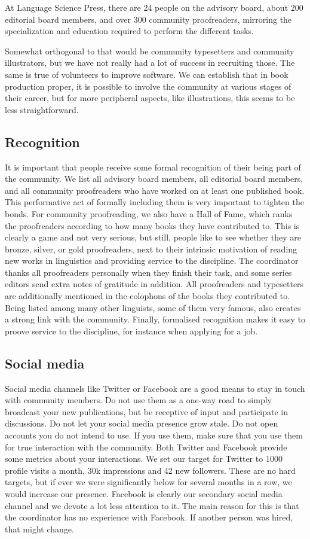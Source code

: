 \documentclass[guidelines,nonflat,modfonts] {langsci/langscibook}
\begin{document}
At Language Science Press, there are 24 people on the advisory board, about 200 editorial board members, and over 300 community proofreaders, mirroring the specialization and education required to perform the different tasks. 

Somewhat orthogonal to that would be community typesetters and community illustrators, but we have not really had a lot of success in recruiting those. The same is true of volunteers to improve software. We can establish that in book production proper, it is possible to involve the community at various stages of their career, but for more peripheral aspects, like illustrations, this seems to be less straightforward. 

\subsection{Recognition}
It is important that people receive some formal recognition of their being part of the community. We list all advisory board members, all editorial board members, and all community proofreaders who have worked on at least one published book. This performative act of formally including them is very important to tighten the bonds. For community proofreading, we also have a Hall of Fame, which ranks the proofreaders according to how many books they have contributed to. This is clearly a game and not very serious, but still, people like to see whether they are bronze, silver, or gold proofreaders, next to their intrinsic motivation of reading new works in linguistics and providing service to the discipline. The coordinator thanks all proofreaders personally when they finish their task, and some series editors send extra notes of gratitude in addition. All proofreaders and typesetters are additionally mentioned in the colophons of the books they contributed to. Being listed among many other linguists, some of them very famous, also creates a strong link with the community. Finally, formalised recognition makes it easy to proove service to the discipline, for instance  when applying for a job.

\subsection{Social media}
Social media channels like Twitter or Facebook are a good means to stay in touch with community members. Do not use them as a one-way road to simply broadcast your new publications, but be receptive of input and participate in discussions. Do not let your social media presence grow stale. Do not open accounts you do not intend to use. If you use them, make sure that you use them for true interaction with the community. Both Twitter and Facebook provide some metrics about your interactions. We set our target for Twitter to 1000 profile visits a month, 30k impressions and 42 new followers. These are no hard targets, but if ever we were significantly below for several months in a row, we would increase our presence. 
Facebook is clearly our secondary social media channel and we devote a lot less attention to it. The main reason for this is that the coordinator has no experience with Facebook. If another person was hired, that might change. 
\end{document}

